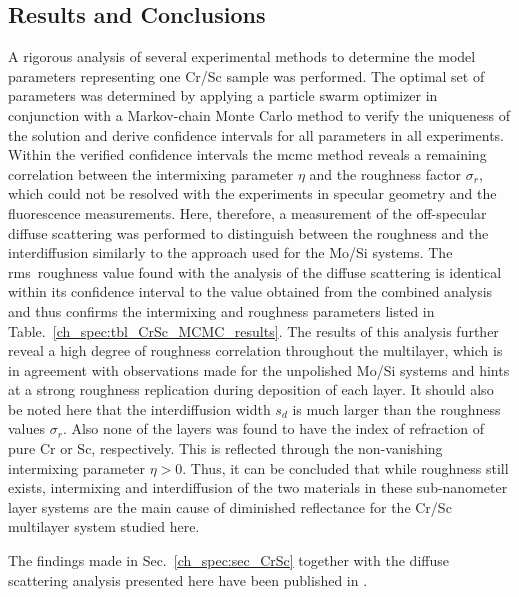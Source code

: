 \subsection{Results and Conclusions}
A rigorous analysis of several experimental methods to determine 
the model parameters representing one Cr/Sc sample was performed. The optimal set of 
parameters was determined by applying a particle swarm optimizer in conjunction 
with a Markov-chain Monte Carlo method to verify the uniqueness of the solution 
and derive confidence intervals for all parameters in all experiments. Within the verified confidence intervals the \gls{mcmc} method reveals a remaining 
correlation between the intermixing parameter $\eta$ and the roughness factor $\sigma_r$, which 
could not be resolved with the experiments in specular geometry and the fluorescence measurements. Here, therefore, a measurement of the off-specular diffuse scattering was performed to distinguish 
between the roughness and the interdiffusion similarly to the approach used for the Mo/Si systems. The \gls{rms}~roughness value found with the analysis of the diffuse scattering is identical within its confidence interval to the value obtained from the combined analysis and thus confirms the intermixing and roughness parameters listed in Table.~\ref{ch_spec:tbl_CrSc_MCMC_results}. The results of this analysis further reveal a high degree of roughness correlation throughout the multilayer, which is in agreement with observations made for the unpolished Mo/Si systems and hints at a strong roughness replication during deposition of each layer. It should also be noted here that the interdiffusion width 
$s_d$ is much larger than the roughness values $\sigma_r$. Also none of the 
layers was found to have the index of refraction of pure Cr or Sc, 
respectively. This is reflected through the non-vanishing intermixing parameter 
$\eta>0$. Thus, it can be concluded that while roughness still exists, 
intermixing and interdiffusion of the two materials in these sub-nanometer layer systems are the main cause of diminished reflectance for the Cr/Sc multilayer system studied here.

The findings made in Sec.~\ref{ch_spec:sec_CrSc} together with the diffuse scattering analysis presented here have been published in .